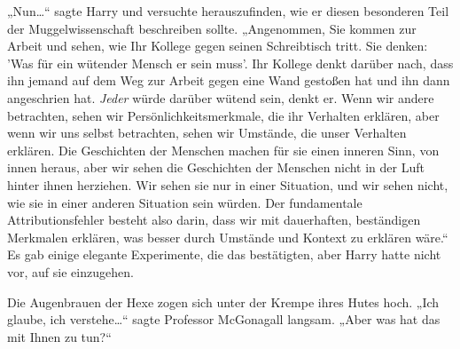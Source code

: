 „Nun…“ sagte Harry und versuchte herauszufinden, wie er diesen besonderen Teil der Muggelwissenschaft beschreiben sollte. „Angenommen, Sie kommen zur Arbeit und sehen, wie Ihr Kollege gegen seinen Schreibtisch tritt. Sie denken: 'Was für ein wütender Mensch er sein muss'. Ihr Kollege denkt darüber nach, dass ihn jemand auf dem Weg zur Arbeit gegen eine Wand gestoßen hat und ihn dann angeschrien hat. \emph{Jeder} würde darüber wütend sein, denkt er. Wenn wir andere betrachten, sehen wir Persönlichkeitsmerkmale, die ihr Verhalten erklären, aber wenn wir uns selbst betrachten, sehen wir Umstände, die unser Verhalten erklären. Die Geschichten der Menschen machen für sie einen inneren Sinn, von innen heraus, aber wir sehen die Geschichten der Menschen nicht in der Luft hinter ihnen herziehen. Wir sehen sie nur in einer Situation, und wir sehen nicht, wie sie in einer anderen Situation sein würden. Der fundamentale Attributionsfehler besteht also darin, dass wir mit dauerhaften, beständigen Merkmalen erklären, was besser durch Umstände und Kontext zu erklären wäre.“ Es gab einige elegante Experimente, die das bestätigten, aber Harry hatte nicht vor, auf sie einzugehen.

Die Augenbrauen der Hexe zogen sich unter der Krempe ihres Hutes hoch. „Ich glaube, ich verstehe…“ sagte Professor McGonagall langsam. „Aber was hat das mit Ihnen zu tun?“

